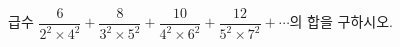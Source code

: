 급수 $\dfrac{6}{2^2\times 4^2}+\dfrac{8}{3^2\times 5^2}+\dfrac{10}{4^2\times 6^2}+\dfrac{12}{5^2\times 7^2}+\cdots$의 합을 구하시오.
